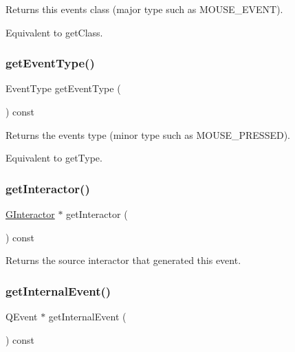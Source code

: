 Returns this event\textquotesingle{}s class (major type such as M\+O\+U\+S\+E\+\_\+\+E\+V\+E\+NT). 

Equivalent to get\+Class. \mbox{\label{classGEvent_a404fe4b126a8443600109a62ef7ce6a2}} 
\subsubsection{\texorpdfstring{get\+Event\+Type()}{getEventType()}}
{\footnotesize\ttfamily Event\+Type get\+Event\+Type (\begin{DoxyParamCaption}{ }\end{DoxyParamCaption}) const\hspace{0.3cm}{\ttfamily [virtual]}}



Returns the event\textquotesingle{}s type (minor type such as M\+O\+U\+S\+E\+\_\+\+P\+R\+E\+S\+S\+ED). 

Equivalent to get\+Type. \mbox{\label{classGEvent_ac8998a7ac699a98fbdc125ef0f3d64f1}} 
\subsubsection{\texorpdfstring{get\+Interactor()}{getInteractor()}}
{\footnotesize\ttfamily \mbox{\hyperlink{classGInteractor}{G\+Interactor}} $\ast$ get\+Interactor (\begin{DoxyParamCaption}{ }\end{DoxyParamCaption}) const\hspace{0.3cm}{\ttfamily [virtual]}}



Returns the source interactor that generated this event. 

\mbox{\label{classGEvent_ab3589ee7d7005f6a323ff2c968f82038}} 
\subsubsection{\texorpdfstring{get\+Internal\+Event()}{getInternalEvent()}}
{\footnotesize\ttfamily Q\+Event $\ast$ get\+Internal\+Event (\begin{DoxyParamCaption}{ }\end{DoxyParamCaption}) const\hspace{0.3cm}{\ttfamily [virtual]}}




